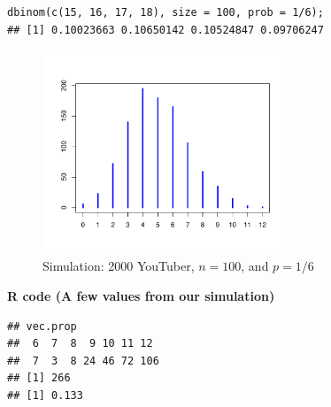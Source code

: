 \begin{tcolorbox}[colback=gray!10, colframe=black!45, arc=2mm]
\begin{verbatim}
dbinom(c(15, 16, 17, 18), size = 100, prob = 1/6);
## [1] 0.10023663 0.10650142 0.10524847 0.09706247
\end{verbatim}
\end{tcolorbox}
\vspace{1em}
\begin{figure}[H]
  \centering
  \includegraphics[width=0.65\textwidth]{section11/images/binomial_simulation_histogram.pdf}
  \vspace{-2em} %
\captionsetup{skip=0pt}
  \caption{Simulation: 2000 YouTuber, $n = 100$, and $p = 1/6$}
\end{figure}
\vspace{1em}
\noindent\textbf{R code (A few values from our simulation)}

\begin{tcolorbox}[colback=gray!10, colframe=black!45, arc=2mm]
\begin{verbatim}
## vec.prop
##  6  7  8  9 10 11 12 
##  7  3  8 24 46 72 106 
## [1] 266
## [1] 0.133
\end{verbatim}
\end{tcolorbox}
\vspace{1em}

